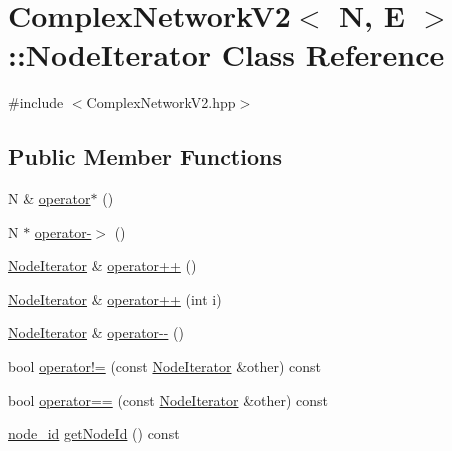 \hypertarget{class_complex_network_v2_1_1_node_iterator}{\section{Complex\+Network\+V2$<$ N, E $>$\+:\+:Node\+Iterator Class Reference}
\label{class_complex_network_v2_1_1_node_iterator}
}


{\ttfamily \#include $<$Complex\+Network\+V2.\+hpp$>$}

\subsection*{Public Member Functions}
\begin{DoxyCompactItemize}
\item 
N \& \hyperlink{class_complex_network_v2_1_1_node_iterator_a44d9128cc9ed0835109f8f9456b895ab}{operator$\ast$} ()
\item 
N $\ast$ \hyperlink{class_complex_network_v2_1_1_node_iterator_a3a7857235e94c7e66fcab20ad384626c}{operator-\/$>$} ()
\item 
\hyperlink{class_complex_network_v2_1_1_node_iterator}{Node\+Iterator} \& \hyperlink{class_complex_network_v2_1_1_node_iterator_a0b4fde5b22517de5938386fe14158615}{operator++} ()
\item 
\hyperlink{class_complex_network_v2_1_1_node_iterator}{Node\+Iterator} \& \hyperlink{class_complex_network_v2_1_1_node_iterator_a623b66e0065252e00ccd3039f8a3bd0c}{operator++} (int i)
\item 
\hyperlink{class_complex_network_v2_1_1_node_iterator}{Node\+Iterator} \& \hyperlink{class_complex_network_v2_1_1_node_iterator_a152a2bde89af86f13578037d94776cb8}{operator-\/-\/} ()
\item 
bool \hyperlink{class_complex_network_v2_1_1_node_iterator_a0570890a12ef213c474492c8444d3bf1}{operator!=} (const \hyperlink{class_complex_network_v2_1_1_node_iterator}{Node\+Iterator} \&other) const 
\item 
bool \hyperlink{class_complex_network_v2_1_1_node_iterator_a579b10eeff35231dcc96eb22373c7b85}{operator==} (const \hyperlink{class_complex_network_v2_1_1_node_iterator}{Node\+Iterator} \&other) const 
\item 
\hyperlink{_complex_network_v2_8hpp_a8323334ca788fde39682469321590d52}{node\+\_\+id} \hyperlink{class_complex_network_v2_1_1_node_iterator_a4863bcbe83fc0cb28eb6159bd1326c47}{get\+Node\+Id} () const 
\end{DoxyCompactItemize}
